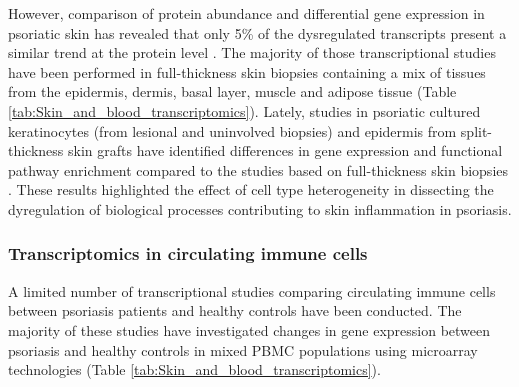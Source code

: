 \noindent However, comparison of protein abundance and differential gene expression in psoriatic skin has revealed that only 5\% of the dysregulated transcripts present a similar trend at the protein level \parencite{Swindell2015}. The majority of those transcriptional studies have been performed in full-thickness skin biopsies containing a mix of tissues from the epidermis, dermis, basal layer, muscle and adipose tissue (Table \ref{tab:Skin_and_blood_transcriptomics}). Lately, studies in psoriatic cultured keratinocytes (from lesional and uninvolved biopsies) and epidermis from split-thickness skin grafts have identified differences in gene expression and functional pathway enrichment compared to the studies based on full-thickness skin biopsies \parencite{Swindell2017,Tervaniemi2016}. These results highlighted the effect of cell type heterogeneity in dissecting the dyregulation of biological processes contributing to skin inflammation in psoriasis.


\subsubsection{Transcriptomics in circulating immune cells}
A limited number of transcriptional studies comparing circulating immune cells between psoriasis patients and healthy controls have been conducted. The majority of these studies have investigated changes in gene expression between psoriasis and healthy controls in mixed PBMC populations using microarray technologies (Table \ref{tab:Skin_and_blood_transcriptomics}). 


